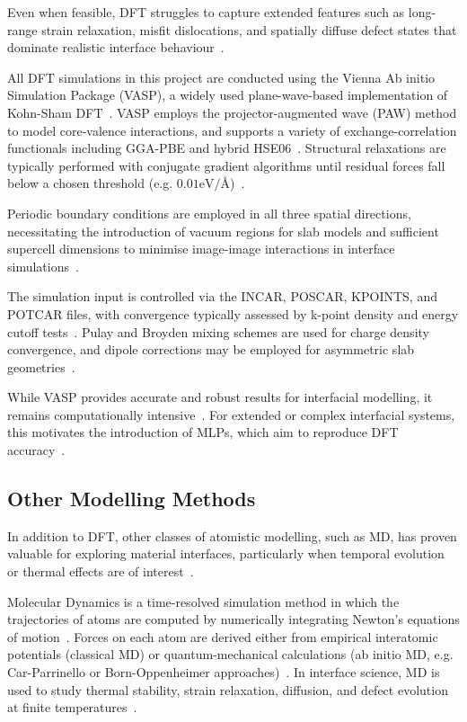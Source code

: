 Even when feasible, DFT struggles to capture extended features such as long-range strain relaxation, misfit dislocations, and spatially diffuse defect states that dominate realistic interface behaviour~\cite{Lorentzon2025-si, Di_Liberto2022-gz}.

All DFT simulations in this project are conducted using the Vienna Ab initio Simulation Package (VASP), a widely used plane-wave-based implementation of Kohn-Sham DFT~\nocite{}.
VASP employs the projector-augmented wave (PAW) method to model core-valence interactions, and supports a variety of exchange-correlation functionals including GGA-PBE and hybrid HSE06~\cite{Leung2020-tv}.
Structural relaxations are typically performed with conjugate gradient algorithms until residual forces fall below a chosen threshold (e.g. $0.01 \text{eV/\AA{}}$)~\cite{conquest_relax}.

Periodic boundary conditions are employed in all three spatial directions, necessitating the introduction of vacuum regions for slab models and sufficient supercell dimensions to minimise image-image interactions in interface simulations~\cite{militzer2016_supercell}.

The simulation input is controlled via the INCAR, POSCAR, KPOINTS, and POTCAR files, with convergence typically assessed by k-point density and energy cutoff tests~\nocite{}.
Pulay and Broyden mixing schemes are used for charge density convergence, and dipole corrections may be employed for asymmetric slab geometries~\nocite{}.

While VASP provides accurate and robust results for interfacial modelling, it remains computationally intensive~\cite{Butler2019-ws, Leung2020-tv}.
For extended or complex interfacial systems, this motivates the introduction of MLPs, which aim to reproduce DFT accuracy~\cite{Batzner2022-fd, Owen2024-wp}.

\newpage \subsection*{Other Modelling Methods}

In addition to DFT, other classes of atomistic modelling, such as MD, has proven valuable for exploring material interfaces, particularly when temporal evolution or thermal effects are of interest~\cite{Khot2025-hh}.

Molecular Dynamics is a time-resolved simulation method in which the trajectories of atoms are computed by numerically integrating Newton's equations of motion~\cite{Batzner2022-fd, Khot2025-hh}.
Forces on each atom are derived either from empirical interatomic potentials (classical MD) or quantum-mechanical calculations (ab initio MD, e.g. Car-Parrinello or Born-Oppenheimer approaches)~\cite{Batzner2022-fd}.
In interface science, MD is used to study thermal stability, strain relaxation, diffusion, and defect evolution at finite temperatures~\cite{Khot2025-hh}.

